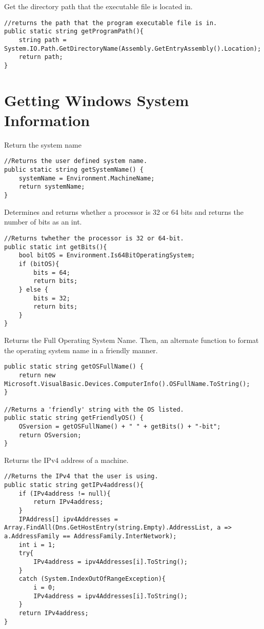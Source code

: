 Get the directory path that the executable file is located in.
\begin{lstlisting}
//returns the path that the program executable file is in.
public static string getProgramPath(){
	string path = System.IO.Path.GetDirectoryName(Assembly.GetEntryAssembly().Location);
	return path;
}
\end{lstlisting}










\section{Getting Windows System Information}

Return the system name
\begin{lstlisting}
//Returns the user defined system name.
public static string getSystemName() {
	systemName = Environment.MachineName;
	return systemName;
}
\end{lstlisting}

Determines and returns whether a processor is 32 or 64 bits and returns the number of bits as an int.
\begin{lstlisting}
//Returns twhether the processor is 32 or 64-bit.
public static int getBits(){
	bool bitOS = Environment.Is64BitOperatingSystem;
	if (bitOS){
		bits = 64;
		return bits;
	} else {
		bits = 32;
		return bits;
	}
}
\end{lstlisting}

Returns the Full Operating System Name. Then, an alternate function to format the operating system name in a friendly manner.
\begin{lstlisting}
public static string getOSFullName() {
	return new Microsoft.VisualBasic.Devices.ComputerInfo().OSFullName.ToString();
}

//Returns a 'friendly' string with the OS listed.
public static string getFriendlyOS() {
	OSversion = getOSFullName() + " " + getBits() + "-bit";
	return OSversion;
}
\end{lstlisting}

Returns the IPv4 address of a machine.
\begin{lstlisting}
//Returns the IPv4 that the user is using.
public static string getIPv4address(){
	if (IPv4address != null){
		return IPv4address;
	}  
	IPAddress[] ipv4Addresses = Array.FindAll(Dns.GetHostEntry(string.Empty).AddressList, a => a.AddressFamily == AddressFamily.InterNetwork);
	int i = 1;
	try{                
		IPv4address = ipv4Addresses[i].ToString();
	}
	catch (System.IndexOutOfRangeException){
		i = 0;
		IPv4address = ipv4Addresses[i].ToString();
	}
	return IPv4address;
}

\end{lstlisting}

